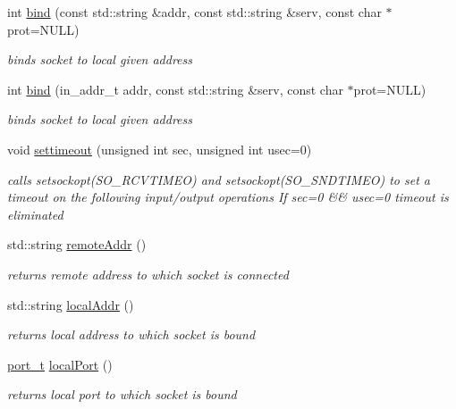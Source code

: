 \begin{CompactItemize}
int \hyperlink{classsocketpp_1_1BaseSocket_4775f13f8e1cceaaed40106162b2149f}{bind} (const std::string \&addr, const std::string \&serv, const char $\ast$prot=NULL)
\begin{CompactList}\small\item\em binds socket to local given address \item\end{CompactList}\item 
int \hyperlink{classsocketpp_1_1BaseSocket_aab800bcb5ee48cd4410ae2b9ed83e23}{bind} (in\_\-addr\_\-t addr, const std::string \&serv, const char $\ast$prot=NULL)
\begin{CompactList}\small\item\em binds socket to local given address \item\end{CompactList}\item 
void \hyperlink{classsocketpp_1_1BaseSocket_49718984476b4126889d3a26045b1fdc}{settimeout} (unsigned int sec, unsigned int usec=0)
\begin{CompactList}\small\item\em calls setsockopt(SO\_\-RCVTIMEO) and setsockopt(SO\_\-SNDTIMEO) to set a timeout on the following input/output operations If sec=0 \&\& usec=0 timeout is eliminated \item\end{CompactList}\item 
std::string \hyperlink{classsocketpp_1_1BaseSocket_483c6186ae60d0c399983e14f55af600}{remoteAddr} ()
\begin{CompactList}\small\item\em returns remote address to which socket is connected \item\end{CompactList}\item 
std::string \hyperlink{classsocketpp_1_1BaseSocket_0caed2e7d3f0e4db7d4c1aa3aba52caf}{localAddr} ()
\begin{CompactList}\small\item\em returns local address to which socket is bound \item\end{CompactList}\item 
\hyperlink{namespacesocketpp_5517ef80f249b891a2ba64b95fc1e723}{port\_\-t} \hyperlink{classsocketpp_1_1BaseSocket_d4a2c0e4932436ef61f911514385d16c}{localPort} ()
\begin{CompactList}\small\item\em returns local port to which socket is bound \item\end{CompactList}\item 

\end{CompactItemize}
